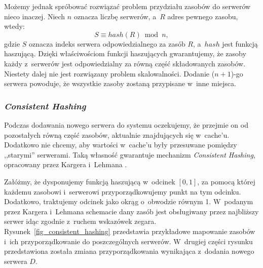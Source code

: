 \documentclass[a4paper,11pt]{scrartcl}
\newcommand{\s}{ }
\newcommand{\keszu}{cache'u}
\begin{document}
Możemy jednak spróbować rozwiązać problem przydziału zasobów do serwerów nieco inaczej. Niech $n$ oznacza liczbę serwerów, a~$R$ adres pewnego zasobu, wtedy:
\begin{equation*}
S \equiv hash(R) \bmod n,
\end{equation*}
 gdzie $S$ oznacza indeks serwera odpowiedzialnego za zasób $R$, a~$hash$ jest funkcją haszującą. Dzięki właściwościom funkcji haszujących gwarantujemy, że zasoby każdy z~serwerów jest odpowiedzialny za równą część składowanych zasobów. Niestety dalej nie jest rozwiązany problem skalowalności. Dodanie ($n+1$)-go serwera powoduje, że wszystkie zasoby zostaną przypisane w~inne miejsca.
 
\subsubsection{\textit{Consistent Hashing}}
\label{sect_consistent_hashing}
Podczas dodawania nowego serwera do systemu oczekujemy, że przejmie on od pozostałych równą część zasobów, aktualnie znajdujących się w~\keszu. Dodatkowo nie chcemy, aby wartości w~\keszu\s były przesuwane pomiędzy ,,starymi'' serwerami. Taką własność gwarantuje mechanizm \textit{Consistent Hashing}, opracowany przez Kargera i~Lehmana \cite{karger1997consistent}.

Załóżmy, że dysponujemy funkcją haszującą w~odcinek $[0, 1]$, za pomocą której każdemu zasobowi i~serwerowi przyporządkowujemy punkt na tym odcinku. Dodatkowo, traktujemy odcinek jako okrąg o~obwodzie równym 1. W~podanym przez Kargera i~Lehmana schemacie dany zasób jest obsługiwany przez najbliższy serwer idąc zgodnie z~ruchem wskazówek zegara. Rysunek~\ref{fig_consistent_hashing} przedstawia przykładowe mapowanie zasobów i~ich przyporządkowanie do poszczególnych serwerów. W~drugiej części rysunku przedstawiona została zmiana przyporządkowania wynikająca z~dodania nowego serwera $D$.
\end{document}

